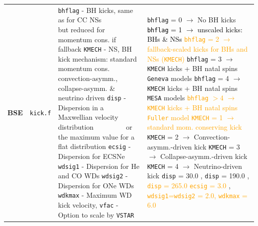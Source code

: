 \begin{landscape}
\begin{table}
\begin{tabular}{|l|l|l|l|}
				\hline \textbf{BSE} & \texttt{kick.f}  & \makecell[l]{\texttt{bhflag} - BH kicks, same as for CC NSs \\ $\qquad\qquad$ but reduced for momentum cons. if fallback \\ \texttt{KMECH} - NS, BH kick mechanism: standard momentum cons. \\  convection-asymm., collapse-asymm. \& neutrino driven \\ \texttt{disp} - Dispersion in a Maxwellian velocity distribution \\ $\qquad\qquad$ or the maximum value for a flat distribution  \\ \texttt{ecsig} - Dispersion for ECSNe \\ \texttt{wdsig1} - Dispersion for He and CO WDs \\ \texttt{wdsig2} - Dispersion for ONe WDs \\ \texttt{wdkmax} - Maximum WD kick velocity,  \\ \texttt{vfac} - Option to scale by \texttt{VSTAR} } &  \makecell[l]{\texttt{bhflag} = 0 $\rightarrow$ No BH kicks $\quad$ \textcolor{black}{\texttt{bhflag} = 1 $\rightarrow$ unscaled kicks: BHs \& NSs} \cite{Belczynskietal2002}
					\\ \textcolor{orange}{\texttt{bhflag} = 2 $\rightarrow$ fallback-scaled kicks for BHs and NSs (\texttt{KMECH})} \\ \texttt{bhflag} = 3 $\rightarrow$ \texttt{KMECH} kicks + BH natal spins \texttt{Geneva} models \cite{Banerjee2020,Banerjee2021a} \\ \texttt{bhflag} = 4 $\rightarrow$  \texttt{KMECH} kicks + BH natal spins \texttt{MESA} models \cite{Banerjee2020,Banerjee2021a} \\ \textcolor{orange}{\texttt{bhflag} $>4$ $\rightarrow$ \texttt{KMECH} kicks + BH natal spins \texttt{Fuller} model} \cite{Banerjee2020,Banerjee2021a} \\ \textcolor{orange}{\texttt{KMECH} = 1 $\rightarrow$ standard mom. conserving kick} \cite{Belczynskietal2008} \\ \texttt{KMECH} = 2 $\rightarrow$ Convection-asymm.-driven kick \cite{Banerjee2020}\\ \texttt{KMECH} = 3 $\rightarrow$ Collapse-asymm.-driven kick \cite{Banerjee2020}\\ \texttt{KMECH} = 4 $\rightarrow$ Neutrino-driven kick\cite{Banerjee2020}\\ \texttt{disp} = 30.0 \cite{Wang2016}, \texttt{disp} = 190.0 \cite{HansenPhinney1997}, \\ \textcolor{orange}{\texttt{disp} = 265.0} \cite{Hobbsetal2005} \\ \textcolor{orange}{\texttt{ecsig} = 3.0} \cite{GessnerJanka2018}, \textcolor{orange}{\texttt{wdsig1}=\texttt{wdsig2} = 2.0, \quad \texttt{wdkmax} = 6.0} \cite{Fellhaueretal2003}} \\

\end{tabular}
\end{table}
\end{landscape}
